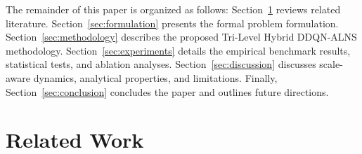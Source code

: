 \documentclass{ieeeaccess}
\begin{document}
The remainder of this paper is organized as follows: Section~\ref{sec:related_work} reviews related literature. Section~\ref{sec:formulation} presents the formal problem formulation. Section~\ref{sec:methodology} describes the proposed Tri-Level Hybrid DDQN-ALNS methodology. Section~\ref{sec:experiments} details the empirical benchmark results, statistical tests, and ablation analyses. Section~\ref{sec:discussion} discusses scale-aware dynamics, analytical properties, and limitations. Finally, Section~\ref{sec:conclusion} concludes the paper and outlines future directions.

\section{Related Work}
\label{sec:related_work}
\end{document}
